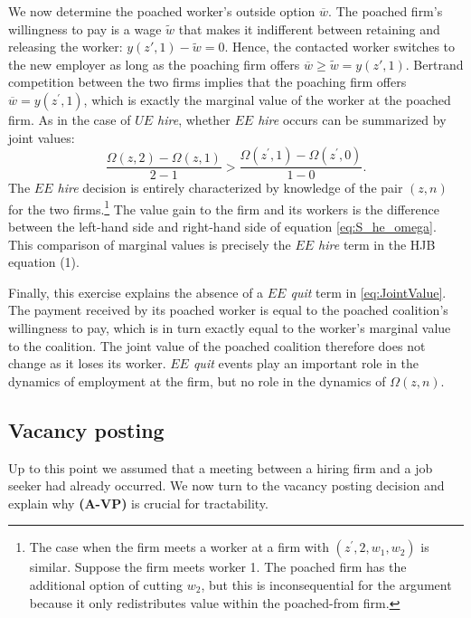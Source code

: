 We now determine the poached worker's outside option $\overline{w}$.
The poached firm's willingness to pay is a wage $\widetilde{w}$ that makes it indifferent between retaining and releasing the worker: $y(z',1) - \widetilde{w} = 0$.
Hence, the contacted worker 
switches to the new employer as long as the poaching firm offers $\overline{w} \geq \widetilde{w} = y(z',1)$.
Bertrand competition between the two firms implies that the poaching firm offers $\overline{w}=y(z^\prime,1)$, which is exactly the marginal value of the worker at the poached firm. As in the case of \emph{$UE$ hire}, whether \emph{$EE$ hire} occurs can be summarized by joint values:
\vspace*{-.1cm}\begin{equation} \label{eq:S_he_omega}
\frac{\Omega \left( z,2\right) -\Omega \left( z,1\right)}{2-1} >
\frac{\Omega \left( z^{\prime},1\right) -\Omega \left( z^{\prime },0\right)}{1-0}.
\end{equation}
The \emph{$EE$ hire} decision is entirely characterized by knowledge of the pair $(z,n)$ for the two firms.\footnote{
    The case when the firm meets a worker at a firm with $(z^\prime,2,w_1,w_2)$ is similar.
    Suppose the firm meets worker 1.
    The poached firm has the additional option of cutting $w_2$, but this is inconsequential for the argument because it only redistributes value within the poached-from firm.
    }  The value gain to the firm and its workers is the difference between the left-hand side and right-hand side of equation \eqref{eq:S_he_omega}. This comparison of marginal values is precisely the \emph{$EE$ hire} term in the HJB equation (1).

Finally, this exercise explains the absence of a \emph{$EE$ quit} term in \eqref{eq:JointValue}.
The payment received by its poached worker is equal to the poached coalition's willingness to pay, which is in turn exactly equal to the worker's marginal value to the coalition.
The joint value of the poached coalition therefore does not change as it loses its worker.
\emph{$EE$ quit} events play an important role in the dynamics of employment at the firm, but no role in the dynamics of $\Omega(z,n)$.

\subsection{Vacancy posting \label{static:vacancies}}
Up to this point we assumed that a meeting between a hiring firm and a job seeker had already occurred. We now turn to the vacancy posting decision and explain why \textbf{(A-VP)} is crucial for tractability.

